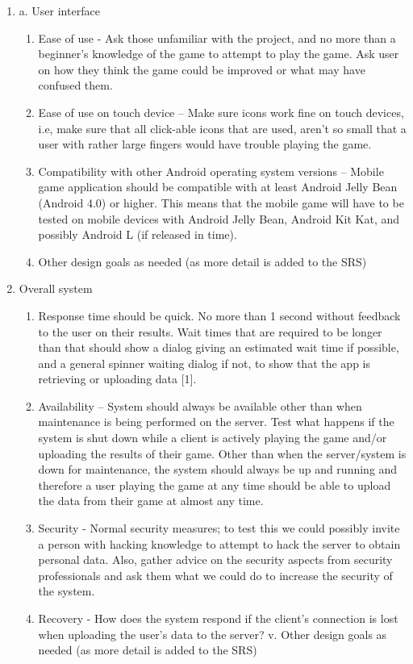 \documentclass[a4wide]{article}
\begin{document}
\begin{enumerate}
\begin{enumerate}
\item a.	User interface
\begin{enumerate}
\item	Ease of use - Ask those unfamiliar with the project, and no more than a beginner’s knowledge of the game to attempt to play the game. Ask user on how they think the game could be improved or what may have confused them.
\item	Ease of use on touch device – Make sure icons work fine on touch devices, i.e, make sure that all click-able icons that are used, aren't so small that a user with rather large fingers would have trouble playing the game.
\item	Compatibility with other Android operating system versions – Mobile game application should be compatible with at least Android Jelly Bean (Android 4.0) or higher. This means that the mobile game will have to be tested on mobile devices with Android Jelly Bean, Android Kit Kat, and possibly Android L (if released in time).
\item 	Other design goals as needed (as more detail is added to the SRS)
\end{enumerate}
\item	Overall system
\begin{enumerate}
\item	 Response time should be quick. No more than 1 second without feedback to the user on their results. Wait times that are required to be longer than that should show a dialog giving an estimated wait time if possible, and a general spinner waiting dialog if not, to show that the app is retrieving or uploading data [1].
\item	Availability – System should always be available other than when maintenance is being performed on the server. Test what happens if the system is shut down while a client is actively playing the game and/or uploading the results of their game. Other than when the server/system is down for maintenance, the system should always be up and running and therefore a user playing the game at any time should be able to upload the data from their game at almost any time.
\item	Security - Normal security measures; to test this we could possibly invite a person with hacking knowledge to attempt to hack the server to obtain personal data. Also, gather advice on the security aspects from security professionals  and ask them what we could do to increase the security of the system.
\item	Recovery - How does the system respond if the client’s connection is lost when uploading the user’s data to the server?
v.	Other design goals as needed (as more detail is added to the SRS)
\end{enumerate}


\end{enumerate}
\end{enumerate}
\end{document}
